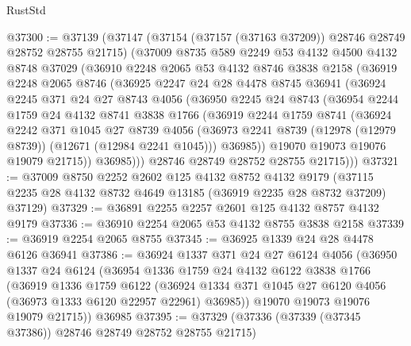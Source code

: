 \begin{lexlean}{RustStd}
\begin{coremodule}
@37300 := @37139
    (@37147
      (@37154 (@37157 (@37163 @37209)) @28746 @28749 @28752 @28755 @21715)
      (@37009
        @8735
        @589
        @2249
        @53
        @4132
        @4500
        @4132
        @8748
        @37029
        (@36910
          @2248
          @2065
          @53
          @4132
          @8746
          @3838
          @2158
          (@36919
            @2248
            @2065
            @8746
            (@36925
              @2247
              @24
              @28
              @4478
              @8745
              @36941
              (@36924
                @2245
                @371
                @24
                @27
                @8743
                @4056
                (@36950
                  @2245
                  @24
                  @8743
                  (@36954
                    @2244
                    @1759
                    @24
                    @4132
                    @8741
                    @3838
                    @1766
                    (@36919
                      @2244
                      @1759
                      @8741
                      (@36924
                        @2242
                        @371
                        @1045
                        @27
                        @8739
                        @4056
                        (@36973 @2241 @8739 (@12978 (@12979 @8739)) (@12671 (@12984 @2241 @1045)))
                        @36985))
                    @19070
                    @19073
                    @19076
                    @19079
                    @21715))
                @36985)))
          @28746
          @28749
          @28752
          @28755
          @21715)))
@37321 := @37009
    @8750
    @2252
    @2602
    @125
    @4132
    @8752
    @4132
    @9179
    (@37115 @2235 @28 @4132 @8732 @4649 @13185 (@36919 @2235 @28 @8732 @37209) @37129)
@37329 := @36891 @2255 @2257 @2601 @125 @4132 @8757 @4132 @9179
@37336 := @36910 @2254 @2065 @53 @4132 @8755 @3838 @2158
@37339 := @36919 @2254 @2065 @8755
@37345 := @36925 @1339 @24 @28 @4478 @6126 @36941
@37386 := @36924
    @1337
    @371
    @24
    @27
    @6124
    @4056
    (@36950
      @1337
      @24
      @6124
      (@36954
        @1336
        @1759
        @24
        @4132
        @6122
        @3838
        @1766
        (@36919
          @1336
          @1759
          @6122
          (@36924 @1334 @371 @1045 @27 @6120 @4056 (@36973 @1333 @6120 @22957 @22961) @36985))
        @19070
        @19073
        @19076
        @19079
        @21715))
    @36985
@37395 := @37329 (@37336 (@37339 (@37345 @37386)) @28746 @28749 @28752 @28755 @21715)

\end{coremodule}
\end{lexlean}

